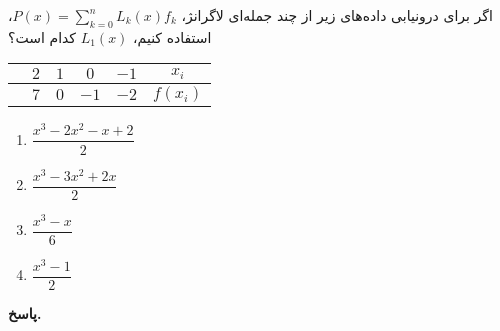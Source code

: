 اگر برای درونیابی داده‌های زیر  از چند جمله‌ای لاگرانژ،
\(P(x) = \sum_{k=0}^{n} L_k(x) f_k\)،
استفاده کنیم، 
\(L_1(x)\)
کدام است؟
\begin{center}
	\begin{tabular}{ccccc|c}
		 & \(2\) &\(1\)&\(0\) & \(-1\) & \(x_i\)\\
		\hline
			& \(7\) & \(0\) & \(-1\) &\( -2\) & \(f(x_i)\)
	\end{tabular}
\end{center}

\vspace*{-1.5cm}
 \begin{enumerate}
	\item \(\dfrac{x^3-2x^2-x+2}{2}\)
	\item \(\dfrac{x^3-3x^2+2x}{2}\)
	\item \(\dfrac{x^3-x}{6}\)
	\item \(\dfrac{x^3-1}{2}\)
\end{enumerate}

\begin{answer}

	\textbf{پاسخ.}
	
\end{answer}
